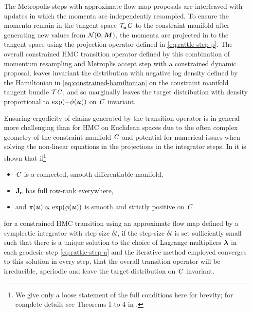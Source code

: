 The Metropolis steps with approximate flow map proposals are interleaved with updates in which the momenta are independently resampled. To ensure the momenta remain in the tangent space $\mathcal{T}_{\boldsymbol{u}}\mathit{C}$ to the constraint manifold after generating new values  from $\nrm{\vct{0},\mtx{M}}$, the momenta are projected in to the tangent space using the projection operator defined in \eqref{eq:rattle-step-p}. The overall constrained \ac{HMC} transition operator defined by this combination of momentum resampling and Metroplis accept step with a constrained dynamic proposal, leaves invariant the distribution with negative log density defined by the Hamiltonian in \eqref{eq:constrained-hamiltonian} on the constraint manifold tangent bundle $\mathcal{T}\mathit{C}$, and so marginally leaves the target distribution with density proportional to $\exp\lpa-\phi(\vct{u})\rpa$ on $\mathit{C}$ invariant.

Ensuring ergodicity of chains generated by the transition operator is in general more challenging than for \ac{HMC} on Euclidean spaces due to the often complex geometry of the constraint manifold $\mathit{C}$ and potential for numerical issues when solving the non-linear equations in the projections in the integrator steps. In \citep{brubaker2012family} it is shown that if\footnote{We give only a loose statement of the full conditions here for brevity; for complete details see Theorems 1 to 4 in \citep{brubaker2012family}.}
\begin{itemize}
  \item $\mathit{C}$ is a connected, smooth differentiable manifold, 
  \item $\mathbf{J}_{{\mathbf{c}}}$ has full row-rank everywhere, 
  \item and $\pi(\vct{u}) \propto \exp\lpa\phi(\vct{u})\rpa$ is smooth and strictly positive on $\mathit{C}$
\end{itemize}
for a constrained \ac{HMC} transition using an approximate flow map defined by a symplectic integrator with step size $\delta t$, if the step-size $\delta t$ is set sufficiently small such that there is a unique solution to the choice of Lagrange multipliers $\boldsymbol{\lambda}$ in each geodesic step \eqref{eq:rattle-step-a} and the iterative method employed converges to this solution in every step, that the overall transition operator will be irreducible, aperiodic and leave the target distribution on $\mathit{C}$ invariant.

